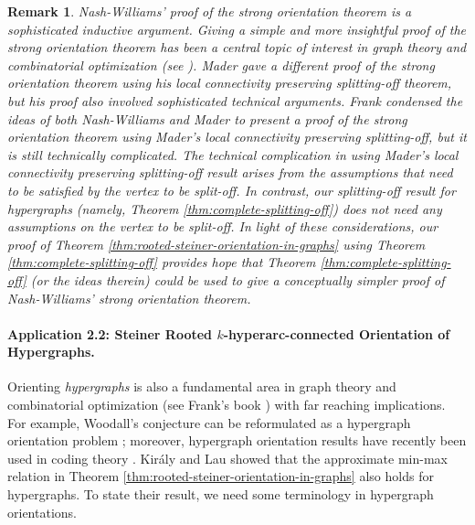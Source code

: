 \documentclass{article}
\newtheorem{remark}{Remark}[section]
\begin{document}
\begin{remark}
Nash-Williams' proof of the strong orientation theorem \cite{NW60} is a sophisticated inductive argument. Giving a simple and more insightful proof of the strong orientation theorem has been a central topic of interest in graph theory and combinatorial optimization (see \cite{Frank93:Applications-of-submod-functions}). Mader \cite{Mad78} gave a different proof of the strong orientation theorem using his local connectivity preserving splitting-off theorem, but his proof also involved sophisticated technical arguments. Frank \cite{Frank93:Applications-of-submod-functions} condensed the ideas of both Nash-Williams and Mader to present a proof of the strong orientation theorem using Mader's local connectivity preserving splitting-off, but it is still technically complicated. The technical complication in using Mader's local connectivity preserving splitting-off result arises from the assumptions that need to be satisfied by the vertex to be split-off. In contrast, our splitting-off result for hypergraphs (namely, Theorem \ref{thm:complete-splitting-off}) does not need any assumptions on the vertex to be split-off. In light of these considerations, our proof of Theorem \ref{thm:rooted-steiner-orientation-in-graphs} using Theorem \ref{thm:complete-splitting-off} provides hope that Theorem \ref{thm:complete-splitting-off} (or the ideas therein) could be used to give a conceptually simpler proof of Nash-Williams' strong orientation theorem. 
\end{remark}


\paragraph{Application 2.2: Steiner Rooted $k$-hyperarc-connected Orientation of Hypergraphs.}
Orienting \emph{hypergraphs} is also a fundamental area in graph theory and combinatorial optimization (see Frank's book \cite{Frank-book}) 
with far reaching implications. For example, Woodall's conjecture can be reformulated as a hypergraph orientation problem \cite{egres-open-problem-on-head-disjoint-sco}; moreover,  
hypergraph orientation results have recently been used in coding theory \cite{AGL23}.
Kir\'{a}ly and Lau \cite{Kiraly-Lau} showed that the approximate min-max relation in Theorem \ref{thm:rooted-steiner-orientation-in-graphs} also holds for hypergraphs. To state their result, we need some terminology in hypergraph orientations. 
\end{document}
